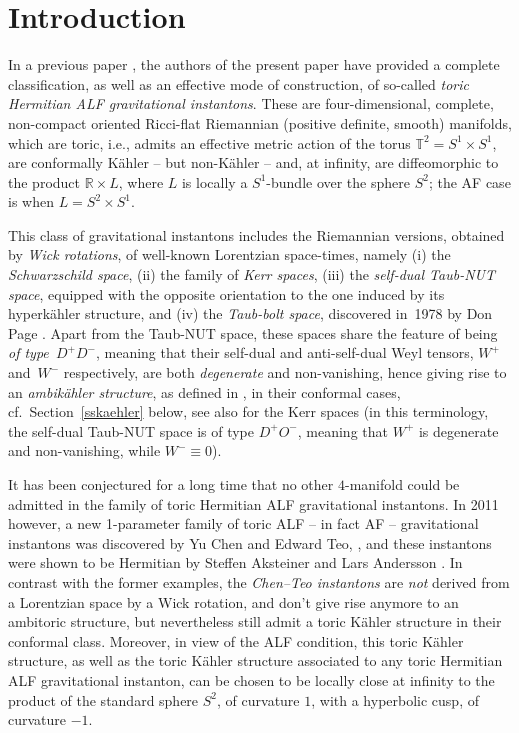 \documentclass[pdftex]{sigma}
\numberwithin{equation}{section}
\begin{document}
\renewcommand{\thefootnote}{\arabic{footnote}}
\setcounter{footnote}{0}

\section{Introduction} In a previous paper \cite{BG}, the authors of the present paper have provided a complete classification, as well as an effective mode of construction, of so-called {\it toric Hermitian ALF gravitational instantons}. These are four-dimensional, complete, non-compact oriented Ricci-flat Riemannian (positive definite, smooth) manifolds, which are toric, i.e., admits an effective metric action of the torus $\mathbb{T} ^2 = S^1 \times S^1$, are conformally K\"ahler -- but non-K\"ahler -- and, at infinity, are diffeomorphic to the product $\mathbb{R} \times L$, where $L$ is locally a $S^1$-bundle over the sphere $S^2$; the AF case is when $L = S ^2 \times S^1$.

This class of gravitational instantons includes the Riemannian versions, obtained by {\it Wick rotations}, of well-known Lorentzian space-times, namely (i) the {\it Schwarzschild space}, (ii) the family of {\it Kerr spaces}, (iii) the {\it self-dual Taub-NUT space}, equipped with the opposite orientation to the one induced by its hyperk\"ahler structure, and (iv) the {\it Taub-bolt space}, discovered in~1978 by Don Page \cite{P}. Apart from the Taub-NUT space, these spaces share the feature of being {\it of type~$D^+D^-$}, meaning that their self-dual and anti-self-dual Weyl tensors, $W^+$ and~$W^-$ respectively, are both {\it degenerate} and non-vanishing, hence giving rise to an {\it ambik\"ahler structure}, as defined in \cite{ACG}, in their conformal cases, cf.\ Section~\ref{sskaehler} below, see also \cite{dixon} for the Kerr spaces (in this terminology, the self-dual Taub-NUT space is of type $D^+O^-$, meaning that $W ^+$ is degenerate and non-vanishing, while $W ^- \equiv 0$).

It has been conjectured for a long time that no other $4$-manifold could be admitted in the family of toric Hermitian ALF gravitational instantons.
In 2011 however, a new 1-parameter family of toric ALF -- in fact AF -- gravitational instantons was discovered by Yu Chen and Edward Teo, \cite{CT2}, and these instantons were shown to be Hermitian by Steffen Aksteiner and Lars Andersson \cite{AA}. In contrast with the former examples, the {\it Chen--Teo instantons} are {\it not} derived from a Lorentzian space by a Wick rotation, and don't give rise anymore to an ambitoric structure, but nevertheless still admit a toric K\"ahler structure in their conformal class. Moreover, in view of the ALF condition, this toric K\"ahler structure, as well as the toric K\"ahler structure associated to any toric Hermitian ALF gravitational instanton, can be chosen to be locally close at infinity to the product of the standard sphere $S^2$, of curvature $1$, with a hyperbolic cusp, of curvature $-1$.
\end{document}
